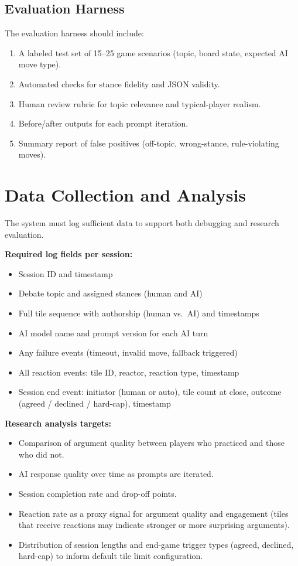 \documentclass[11pt]{article}
\begin{document}
\subsection{Evaluation Harness}

The evaluation harness should include:
\begin{enumerate}
  \item A labeled test set of 15--25 game scenarios (topic, board state, expected AI move type).
  \item Automated checks for stance fidelity and JSON validity.
  \item Human review rubric for topic relevance and typical-player realism.
  \item Before/after outputs for each prompt iteration.
  \item Summary report of false positives (off-topic, wrong-stance, rule-violating moves).
\end{enumerate}

\section{Data Collection and Analysis}

The system must log sufficient data to support both debugging and research evaluation.

\textbf{Required log fields per session:}
\begin{itemize}
  \item Session ID and timestamp
  \item Debate topic and assigned stances (human and AI)
  \item Full tile sequence with authorship (human vs.\ AI) and timestamps
  \item AI model name and prompt version for each AI turn
  \item Any failure events (timeout, invalid move, fallback triggered)
  \item All reaction events: tile ID, reactor, reaction type, timestamp
  \item Session end event: initiator (human or auto), tile count at close, outcome
        (agreed / declined / hard-cap), timestamp
\end{itemize}

\textbf{Research analysis targets:}
\begin{itemize}
  \item Comparison of argument quality between players who practiced and those who did not.
  \item AI response quality over time as prompts are iterated.
  \item Session completion rate and drop-off points.
  \item Reaction rate as a proxy signal for argument quality and engagement
        (tiles that receive reactions may indicate stronger or more surprising arguments).
  \item Distribution of session lengths and end-game trigger types (agreed, declined, hard-cap)
        to inform default tile limit configuration.
\end{itemize}
\end{document}
